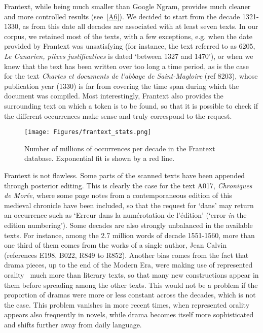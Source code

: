\documentclass[12pt,twocolumn,amsmath,amssymb,aps,longbibliography]{revtex4-1}  %
\newcommand{\tit}{\textit}
\begin{document}
Frantext, while being much smaller than Google Ngram, provides much cleaner and more controlled results (see~\ref{A6}).  We decided to start from the decade 1321-1330, as from this date all decades are associated with at least seven texts. In our corpus, we retained most of the texts, with a few exceptions, e.g. when the date provided by Frantext was unsatisfying (for instance, the text referred to as 6205, \tit{Le Canarien, pi\`eces justificatives} is dated `between 1327 and 1470'), or when we knew that the text has been written over too long a time period, as is the case for the text \tit{Chartes et documents de l'abbaye de Saint-Magloire} (ref 8203), whose publication year (1330) is far from covering the time span during which the document was compiled. Most interestingly, Frantext also provides the surrounding text on which a token is to be found, so that it is possible to check if the different occurrences make sense and truly correspond to the request.

\begin{figure*}[!bp]
  \centering
  \texttt{[image: Figures/frantext\_stats.png]}
  \caption{Number of millions of occurrences per decade in the Frantext database. Exponential fit is shown by a red line.}
  \label{fig:fran_stats}
\end{figure*}

Frantext is not flawless. Some parts of the scanned texts have been appended through posterior editing. This is clearly the case for the text A017,  \tit{Chroniques de Mor\'ee}, where some page notes from a contemporaneous edition of this medieval chronicle have been included, so that the request for `dans' may return an occurrence such as `Erreur dans la num\'erotation de l'\'edition' (`error {\it in} the edition numbering').  Some decades are also strongly unbalanced in the available texts. For instance, among the 2.7 million words of decade 1551-1560, more than one third of them comes from the works of a single author, Jean Calvin (references E198, B022, R849 to R852). Another bias comes from the fact that drama pieces, up to the end of the Modern Era, were making use of represented orality~\cite{marchello2012oral} much more than literary texts, so that many new constructions appear in them before spreading among the other texts. This would not be a problem if the proportion of dramas were more or less constant across the decades, which is not the case. This problem vanishes in more recent times, when represented orality appears also frequently in novels, while drama becomes itself more sophisticated and shifts further away from daily language. 
\end{document}
